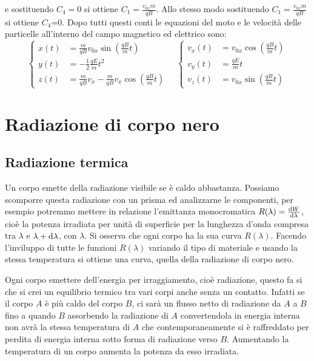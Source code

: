 e sostituendo $C_4=0$ si ottiene $C_1=\frac{v_{0x}m}{qB}$. Allo stesso modo sostituendo $C_1=\frac{v_{0x}m}{qB}$ si ottiene $C_4$=0.
Dopo tutti questi conti le equazioni del moto e le velocità delle particelle all'interno del campo magnetico ed elettrico sono:
\begin{equation}
	\left\{
	\begin{aligned}
		x(t) & =\frac{m}{qB}v_{0x}\sin\left(\frac{qB}{m}t\right)              \\
		y(t) & =-\frac{1}{2}\frac{qE}{m}t^2                                   \\
		z(t) & =\frac{m}{qB}v_x-\frac{m}{qB}v_x\cos\left(\frac{qB}{m}t\right)
	\end{aligned}
	\right.\quad
	\left\{
	\begin{aligned}
		v_x(t) & =v_{0x}\cos\left(\frac{qB}{m}t\right) \\
		v_y(t) & =\frac{qE}{m}t                        \\
		v_z(t) & =v_{0x}\sin\left(\frac{qB}{m}t\right)
	\end{aligned}
	\right.
\end{equation}

\chapter{Radiazione di corpo nero}
\minitoc
\section{Radiazione termica}
Un corpo emette della radiazione visibile se è caldo abbastanza. Possiamo scomporre questa radiazione con un prisma ed analizzarne le componenti, per esempio potremmo mettere in relazione l'emittanza monocromatica $R(\lambda)=\frac{\mathrm{d} W}{\mathrm{d} \lambda}$, cioè la potenza irradiata per unità di superficie per la lunghezza d'onda compresa tra $\lambda$ e $\lambda+\mathrm{d}\lambda$, con $\lambda$. Si osserva che ogni corpo ha la sua curva $R(\lambda)$. Facendo l'inviluppo di tutte le funzioni $R(\lambda)$ variando il tipo di materiale e usando la stessa temperatura si ottiene una curva, quella della radiazione di corpo nero.

Ogni corpo emettere dell'energia per irraggiamento, cioè radiazione, questo fa si che si crei un equilibrio termico tra vari corpi anche senza un contatto. Infatti se il corpo $A$ è più caldo del corpo $B$, ci sarà un flusso netto di radiazione da $A$ a $B$ fino a quando $B$ assorbendo la radiazione di $A$ convertendola in energia interna non avrà la stessa temperatura di $A$ che contemporaneamente si è raffreddato per perdita di energia interna sotto forma di radiazione verso $B$. Aumentando la temperatura di un corpo aumenta la potenza da esso irradiata.

